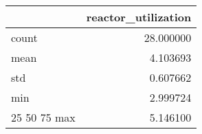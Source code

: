 \begin{tabular}{lr}
\toprule
 & reactor\_utilization \\
\midrule
count & 28.000000 \\
mean & 4.103693 \\
std & 0.607662 \\
min & 2.999724 \\
25%
50%
75%
max & 5.146100 \\
\bottomrule
\end{tabular}

